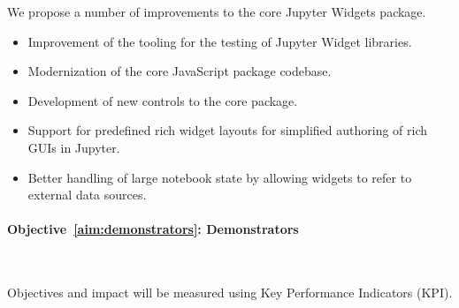 We propose a number of improvements to the core Jupyter Widgets package.

\begin{itemize}
\item Improvement of the tooling for the testing of Jupyter Widget libraries.
\item Modernization of the core JavaScript package codebase.
\item Development of new controls to the core package.
\item Support for predefined rich widget layouts for simplified authoring of rich GUIs in Jupyter.
\item Better handling of large notebook state by allowing widgets to refer to external data sources.
\end{itemize}

\paragraph{Objective~\ref{aim:demonstrators}: Demonstrators}\

Objectives and impact will be measured using Key Performance
Indicators (KPI).

